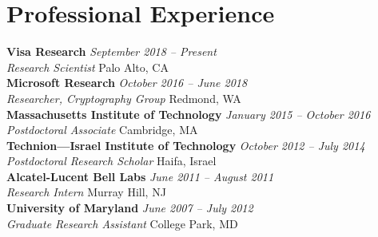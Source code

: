 \documentclass[11pt]{article}
\newcommand{\entry}[4]{
    \vspace{1.5mm}
    \noindent\textbf{#1} \hfill \textit{#2} \\
    \noindent\textit{#3} \hfill #4 \\
}
\begin{document}
\section{Professional Experience}
\entry{Visa Research}{September 2018 – Present}{Research Scientist}{Palo Alto, CA}

\entry{Microsoft Research}{October 2016 – June 2018}{Researcher, Cryptography Group}{Redmond, WA}

\entry{Massachusetts Institute of Technology}{January 2015 – October 2016}{Postdoctoral Associate}{Cambridge, MA}

\entry{Technion—Israel Institute of Technology}{October 2012 – July 2014}{Postdoctoral Research Scholar}{Haifa, Israel}

\entry{Alcatel-Lucent Bell Labs}{June 2011 – August 2011}{Research Intern}{Murray Hill, NJ}

\entry{University of Maryland}{June 2007 – July 2012}{Graduate Research Assistant}{College Park, MD}

\end{document}
